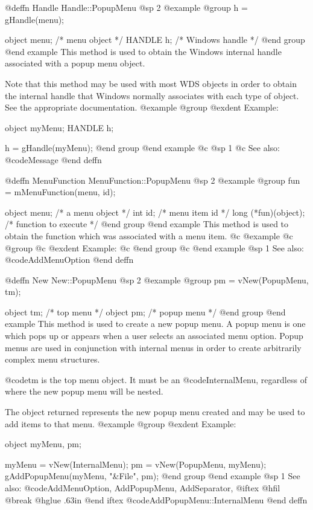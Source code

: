@deffn {Handle} Handle::PopupMenu
@sp 2
@example
@group
h = gHandle(menu);

object  menu;   /*  menu object    */
HANDLE  h;      /*  Windows handle */
@end group
@end example
This method is used to obtain the Windows internal handle associated with
a popup menu object.  

Note that this method may be used with most WDS objects in order to obtain
the internal handle that Windows normally associates with each type of object.
See the appropriate documentation.
@example
@group
@exdent Example:

object  myMenu;
HANDLE  h;

h = gHandle(myMenu);
@end group
@end example
@c @sp 1
@c See also:  @code{Message}
@end deffn








@deffn {MenuFunction} MenuFunction::PopupMenu
@sp 2
@example
@group
fun = mMenuFunction(menu, id);

object  menu;   /*  a menu object     */
int     id;     /*  menu item id      */
long    (*fun)(object);  /*  function to execute  */
@end group
@end example
This method is used to obtain the function which was associated with a
menu item.
@c @example
@c @group
@c @exdent Example:
@c @end group
@c @end example
@sp 1
See also:  @code{AddMenuOption}
@end deffn








@deffn {New} New::PopupMenu
@sp 2
@example
@group
pm = vNew(PopupMenu, tm);

object  tm;     /*  top menu    */
object  pm;     /*  popup menu  */
@end group
@end example
This method is used to create a new popup menu.  A popup menu is one
which pops up or appears when a user selects an associated menu option.
Popup menus are used in conjunction with internal menus in order to
create arbitrarily complex menu structures.

@code{tm} is the top menu object.  It must be an @code{InternalMenu},
regardless of where the new popup menu will be nested.

The object returned represents the new popup menu created and may be
used to add items to that menu.
@example
@group
@exdent Example:

object  myMenu, pm;

myMenu = vNew(InternalMenu);
pm = vNew(PopupMenu, myMenu);
gAddPopupMenu(myMenu, "&File", pm);
@end group
@end example
@sp 1
See also:  @code{AddMenuOption, AddPopupMenu, AddSeparator,}
@iftex
@hfil @break @hglue .63in     
@end iftex
@code{AddPopupMenu::InternalMenu}
@end deffn







